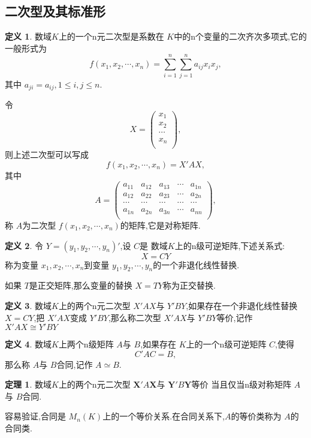 \documentclass[a4paper,11pt]{article}%
\theoremstyle{remark}
\theoremstyle{definition}
\newtheorem{theorem}{定理}[section]
\theoremstyle{definition}
\newtheorem*{definition}{定义}
\theoremstyle{plain}
\begin{document}
\subsection{二次型及其标准形}
\begin{definition}
    数域$K$上的一个n元二次型是系数在 $K$中的n个变量的二次齐次多项式,它的一般形式为
    \[f(x_1,x_2,\cdots,x_n)=\sum_{i=1}^{n}\sum_{j=1}^{n}{a _{ij}x_ix_j},\]
    其中 $a_{ji}=a _{ij},1\leq i,j\leq n.$

    令 
    \[X=\begin{pmatrix}
        x_1\\x_2\\\cdots\\x_n\\
    \end{pmatrix},\]
    则上述二次型可以写成
    \[f(x_1,x_2,\cdots,x_n)=X'AX,\]
    其中 
    \[A=\begin{pmatrix}
        a_{11}&a_{12}&a_{13}&\cdots&a_{1n}\\
        a_{12}&a_{22}&a_{23}&\cdots&a_{2n}\\
        \cdots&\cdots&\cdots&\cdots&\cdots\\
        a_{1n}&a_{2n}&a_{3n}&\cdots&a_{nn}\\
    \end{pmatrix},\]
    称 $A$为二次型 $f(x_1,x_2,\cdots,x_n)$的矩阵,它是对称矩阵.
\end{definition}
\begin{definition}
    令 $Y=(y_1,y_2,\cdots,y_n)'$,设 $C$是 数域$K$上的n级可逆矩阵,下述关系式:
    \[X=CY\]
    称为变量 $x_1,x_2,\cdots,x_n$到变量 $y_1,y_2,\cdots,y_n$的一个非退化线性替换.
\end{definition}
如果 $T$是正交矩阵,那么变量的替换 $X=TY$称为正交替换.
\begin{definition}
    数域$K$上的两个n元二次型 $X'AX$与 $Y'BY$,如果存在一个非退化线性替换 $X=CY$,把
    $X'AX$变成 $Y'BY$,那么称二次型 $X'AX$与 $Y'BY$等价,记作 $X'AX\cong Y'BY$
\end{definition}
\begin{definition}
    数域$K$上两个n级矩阵 $A$与 $B$,如果存在 $K$上的一个n级可逆矩阵 $C$,使得
    \[C'AC=B,\]
    那么称 $A$与 $B$合同,记作 $A\simeq B$.
\end{definition}
\begin{theorem}
    数域$K$上的两个n元二次型 $\mathbf{X}'A\mathbf{X}$与 $\mathbf{Y}'B\mathbf{Y}$等价
    当且仅当n级对称矩阵 $A$与 $B$合同.
\end{theorem}
容易验证,合同是 $M_n(K)$上的一个等价关系.在合同关系下,$A$的等价类称为 $A$的合同类.
\end{document}
